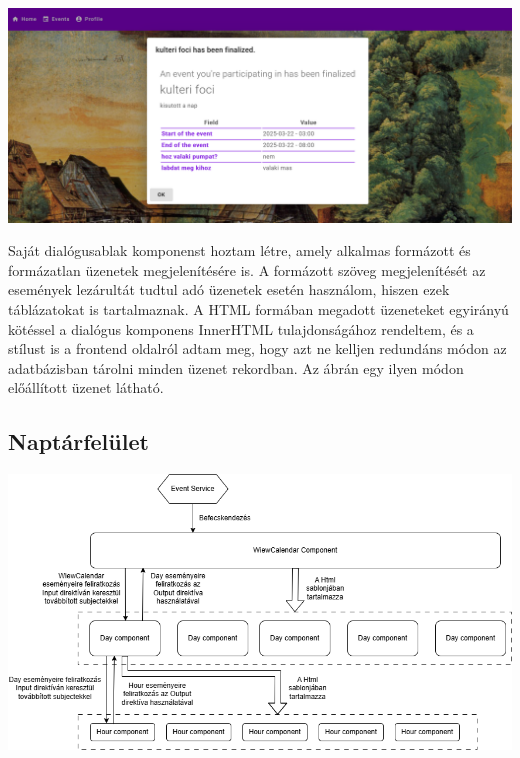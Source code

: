\documentclass[a4paper,12pt]{report}
\theoremstyle{definition}
\theoremstyle{remark}
\begin{document}
\begin{center}
\includegraphics[width=150mm]{notification}
\captionsetup{width=0.8\linewidth}
\end{center}

Saját dialógusablak komponenst hoztam létre, amely alkalmas formázott és formázatlan üzenetek megjelenítésére is. A formázott szöveg megjelenítését az események lezárultát tudtul adó üzenetek esetén használom, hiszen ezek táblázatokat is tartalmaznak.  A HTML formában megadott üzeneteket egyirányú kötéssel a dialógus komponens InnerHTML tulajdonságához rendeltem, és a stílust is a frontend oldalról adtam meg, hogy azt ne kelljen redundáns módon az adatbázisban tárolni minden üzenet rekordban. Az ábrán egy ilyen módon előállított üzenet látható.

	\subsection{Naptárfelület}

\begin{center}
\includegraphics[width=150mm]{view_calendar_structure}
\captionsetup{width=0.8\linewidth}
\end{center}
\end{document}
